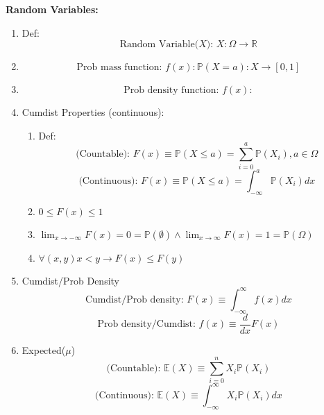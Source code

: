 \documentclass[12pt]{article}
\renewcommand{\=}[1]{\stackrel{#1}{=}} %
\theoremstyle{definition}
\theoremstyle{remark}
\begin{document}
\newpage
\textbf{Random Variables:}
\begin{enumerate}
\item Def:
  \begin{equation}
    \textrm{Random Variable($X$): } X:\Omega\rightarrow \mathbb{R}
  \end{equation}
\item
  \begin{equation}
    \textrm{Prob mass function: } f(x): \mathbb{P}(X=a):X\rightarrow [0,1]
  \end{equation}
\item 
  \begin{equation}
    \textrm{Prob density function: } f(x):
  \end{equation}
\item Cumdist Properties (continuous):
  \begin{enumerate}
  \item Def:
    \begin{equation}
      \textrm{(Countable): }F(x) \equiv \mathbb{P}(X\leq a) =
      \sum_{i=0}^a\mathbb{P}(X_i), a\in\Omega
    \end{equation}
    \begin{equation}
      \textrm{(Continuous): } F(x) \equiv \mathbb{P}(X\leq a) =
      \int_{-\infty}^a\mathbb{P}(X_i)dx
    \end{equation}
  \item $0 \leq F(x) \leq 1$
  \item $ \lim_{x\rightarrow -\infty}F(x) = 0 = \mathbb{P}(\emptyset) \wedge
    \lim_{x\rightarrow \infty}F(x) = 1 = \mathbb{P}(\Omega)$
  \item $\forall (x,y) x<y \rightarrow F(x) \leq F(y)$
  \end{enumerate}
\item Cumdist/Prob Density
  \begin{equation}
    \textrm{Cumdist/Prob density: } F(x) \equiv \int_{-\infty}^{\infty} f(x)dx  
  \end{equation}
  \begin{equation}
    \textrm{Prob density/Cumdist: } f(x) \equiv \frac{d}{dx}F(x)
  \end{equation}
\item Expected($\mu$)
  \begin{equation}
    \textrm{(Countable): } \mathbb{E}(X) \equiv \sum_{i=0}^nX_i\mathbb{P}(X_i)
  \end{equation}
  \begin{equation}
    \textrm{(Continuous): } \mathbb{E}(X) \equiv \int_{-\infty}^{\infty}X_i\mathbb{P}(X_i)dx

\end{equation}
\end{enumerate}
\end{document}
